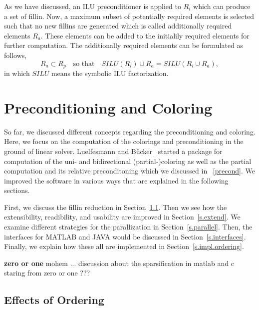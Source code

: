 \documentclass[12pt, oneside]{book}
\newcommand{\todo}[1]{\textbf{#1}}
\begin{document}
As we have discussed, an ILU preconditioner is applied to $R_i$ which can
produce a set of fillin. Now, a maximum subset of potentially required elements
is selected such that no new fillins are generated which is called
additionally required elements $R_a$. These elements can be added to the
initialily required elements for further computation. 
The additionally required elements can be formulated as follows,
$$
R_a \subset R_p \quad\text{so that}\quad SILU(R_i) \cup R_a = SILU(R_i\cup R_a),
$$ 
in which $SILU$ means the symbolic ILU factorization.

\chapter{Preconditioning and Coloring}
\label{package}
So far, we discussed different concepts regarding the preconditioning and coloring.
Here, we focus on the computation of the colorings and preconditioning in the ground of linear solver. 
Luelfesmann and B{\"u}cker~\cite{Lulfesmann2012Fap} started a package for computation of the uni- 
and bidirectional (partial-)coloring as well as the partial computation and its relative preconditoning which we discussed in ~\ref{precond}. 
We improved the software in various ways that are explained in the following sections.

First, we discuss the fillin reduction in Section~\ref{s.ordering.effect}.
Then we see how the extensibility, readibility, and usability are improved 
in Section~\ref{s.extend}. 
We examine different strategies for the parallization 
in Section~\ref{s.parallel}.
Then, the interfaces for MATLAB and JAVA would be discussed
in Section~\ref{s.interfaces}.
Finally, we explain how these all are implemented in
Section~\ref{s.impl.ordering}.

\todo{zero or one}
mohem ... discussion about the sparsification in matlab and c
staring from zero or one ???

\section{Effects of Ordering}
\label{s.ordering.effect}
\end{document}
